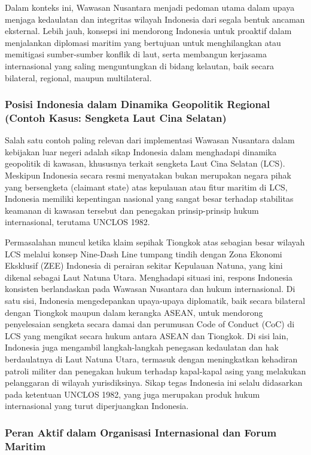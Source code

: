 \documentclass[12pt, a4paper]{article}
\begin{document}
Dalam konteks ini, Wawasan Nusantara menjadi pedoman utama dalam upaya menjaga kedaulatan dan integritas wilayah Indonesia dari segala bentuk ancaman eksternal. Lebih jauh, konsepsi ini mendorong Indonesia untuk proaktif dalam menjalankan diplomasi maritim yang bertujuan untuk menghilangkan atau memitigasi sumber-sumber konflik di laut, serta membangun kerjasama internasional yang saling menguntungkan di bidang kelautan, baik secara bilateral, regional, maupun multilateral.  

\subsubsection*{Posisi Indonesia dalam Dinamika Geopolitik Regional (Contoh Kasus: Sengketa Laut Cina Selatan)}

Salah satu contoh paling relevan dari implementasi Wawasan Nusantara dalam kebijakan luar negeri adalah sikap Indonesia dalam menghadapi dinamika geopolitik di kawasan, khususnya terkait sengketa Laut Cina Selatan (LCS). Meskipun Indonesia secara resmi menyatakan bukan merupakan negara pihak yang bersengketa (claimant state) atas kepulauan atau fitur maritim di LCS, Indonesia memiliki kepentingan nasional yang sangat besar terhadap stabilitas keamanan di kawasan tersebut dan penegakan prinsip-prinsip hukum internasional, terutama UNCLOS 1982.  

Permasalahan muncul ketika klaim sepihak Tiongkok atas sebagian besar wilayah LCS melalui konsep Nine-Dash Line tumpang tindih dengan Zona Ekonomi Eksklusif (ZEE) Indonesia di perairan sekitar Kepulauan Natuna, yang kini dikenal sebagai Laut Natuna Utara. Menghadapi situasi ini, respons Indonesia konsisten berlandaskan pada Wawasan Nusantara dan hukum internasional. Di satu sisi, Indonesia mengedepankan upaya-upaya diplomatik, baik secara bilateral dengan Tiongkok maupun dalam kerangka ASEAN, untuk mendorong penyelesaian sengketa secara damai dan perumusan Code of Conduct (CoC) di LCS yang mengikat secara hukum antara ASEAN dan Tiongkok. Di sisi lain, Indonesia juga mengambil langkah-langkah penegasan kedaulatan dan hak berdaulatnya di Laut Natuna Utara, termasuk dengan meningkatkan kehadiran patroli militer dan penegakan hukum terhadap kapal-kapal asing yang melakukan pelanggaran di wilayah yurisdiksinya. Sikap tegas Indonesia ini selalu didasarkan pada ketentuan UNCLOS 1982, yang juga merupakan produk hukum internasional yang turut diperjuangkan Indonesia.  

\subsubsection*{Peran Aktif dalam Organisasi Internasional dan Forum Maritim}
\end{document}
